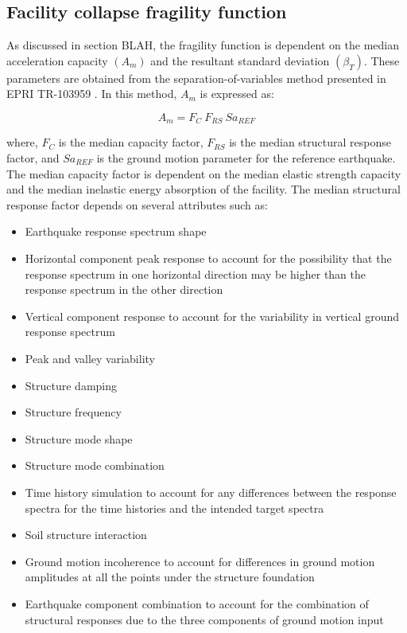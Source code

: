\documentclass[3p]{elsarticle}
\begin{document}
\subsection{Facility collapse fragility function}\label{sec:fra}

As discussed in section BLAH, the fragility function is dependent on the median acceleration capacity $(A_m)$ and the resultant standard deviation $(\beta_T)$. These parameters are obtained from the separation-of-variables method presented in EPRI TR-103959 \cite{EPRI2018}. In this method, $A_m$ is expressed as:

\begin{equation}
\label{eq3}
A_m = F_C~F_{RS}~Sa_{REF}
\end{equation}

\noindent where, $F_C$ is the median capacity factor, $F_{RS}$ is the median structural response factor, and $Sa_{REF}$ is the ground motion parameter for the reference earthquake. The median capacity factor is dependent on the median elastic strength capacity and the median inelastic energy absorption of the facility. The median structural response factor depends on several attributes such as:

\begin{itemize}
    \item Earthquake response spectrum shape
    \item Horizontal component peak response to account for the possibility that the response spectrum in one horizontal direction may be higher than the response spectrum in the other direction
    \item Vertical component response to account for the variability in vertical ground response spectrum
    \item Peak and valley variability
    \item Structure damping
    \item Structure frequency
    \item Structure mode shape
    \item Structure mode combination
    \item Time history simulation to account for any differences between the response spectra for the time histories and the intended target spectra
    \item Soil structure interaction
    \item Ground motion incoherence to account for differences in ground motion amplitudes at all the points under the structure foundation
    \item Earthquake component combination to account for the combination of structural responses due to the three components of ground motion input
\end{itemize}
\end{document}
